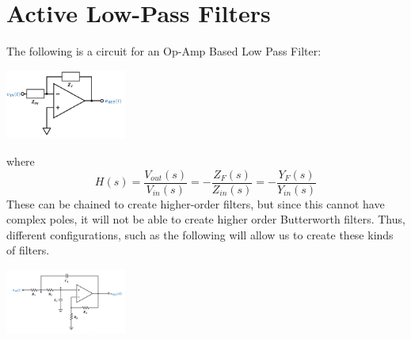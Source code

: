 \documentclass[nobib]{tufte-handout}
\begin{document}
\section{Active Low-Pass Filters}
The following is a circuit for an Op-Amp Based Low Pass Filter:
\begin{center}
    \includegraphics[width = 150px]{images/opamplpfcircuit.png}
\end{center}
where
\begin{equation*}
    H(s) = \frac{V_{out}(s)}{V_{in}(s)} = -\frac{Z_F(s)}{Z_{in}(s)} = -\frac{Y_F(s)}{Y_{in}(s)}
\end{equation*}
These can be chained to create higher-order filters, but since this cannot have complex poles, it will not be able to create higher order Butterworth filters. Thus, different configurations, such as the following will allow us to create these kinds of filters.\\
\begin{center}
    \includegraphics[width = 150px]{images/complexopamplpf.png}
\end{center}
\end{document}
